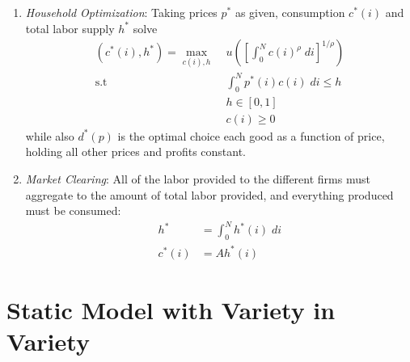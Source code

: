\documentclass[12pt]{article}
\theoremstyle{plain}
\theoremstyle{definition}
\theoremstyle{remark}
\newcommand{\intzN}{\int_0^N}
\begin{document}
\begin{enumerate}
  \item \emph{Household Optimization}: Taking prices $p^*$ as given,
    consumption $c^*(i)$ and total labor supply $h^*$ solve
    \begin{align*}
      (c^*(i), h^*)
      = \max_{c(i), h}
        & \; u\left(
          \left[ \int_0^N c(i)^\rho \; di \right]^{1/\rho}
        \right)\\
      \text{s.t} & \;
        \intzN p^*(i) c(i) \; di \leq h \\
      &\; h\in[0,1] \\
      &\; c(i) \geq 0
    \end{align*}
    while also $d^*(p)$ is the optimal choice each good as a function of
    price, holding all other prices and profits constant.

  \item \emph{Market Clearing}: All of the labor provided to the
    different firms must aggregate to the amount of total labor
    provided, and everything produced must be consumed:
    \begin{align*}
       h^* &= \intzN h^*(i) \; di \\
       c^*(i) &= Ah^*(i)
    \end{align*}
\end{enumerate}




\clearpage
\section{Static Model with Variety in Variety}
\end{document}
